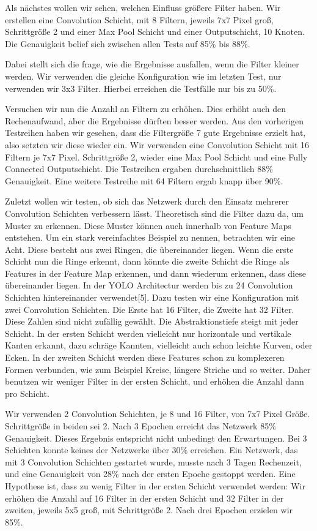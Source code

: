 \documentclass[12pt]{article}
\begin{document}
Als nächstes wollen wir sehen, welchen Einfluss größere Filter haben. Wir erstellen eine Convolution Schicht, mit 8 Filtern, jeweils 7x7 Pixel groß, Schrittgröße 2 und einer Max Pool Schicht und einer Outputschicht, 10 Knoten.
Die Genauigkeit belief sich zwischen allen Tests auf 85\% bis 88\%. 
	
Dabei stellt sich die frage, wie die Ergebnisse ausfallen, wenn die Filter kleiner werden. Wir verwenden die gleiche Konfiguration wie im letzten Test, nur verwenden wir 3x3 Filter.
Hierbei erreichen die Testfälle nur bis zu 50\%. 

Versuchen wir nun die Anzahl an Filtern zu erhöhen. Dies erhöht auch den Rechenaufwand, aber die Ergebnisse dürften besser werden. Aus den vorherigen Testreihen haben wir gesehen, dass die Filtergröße 7 gute Ergebnisse erzielt hat, also setzten wir diese wieder ein.
Wir verwenden eine Convolution Schicht mit 16 Filtern je 7x7 Pixel. Schrittgröße 2, wieder eine Max Pool Schicht und eine Fully Connected Outputschicht. Die Testreihen ergaben durchschnittlich 88\% Genauigkeit. Eine weitere Testreihe mit 64 Filtern ergab knapp über 90\%.

Zuletzt wollen wir testen, ob sich das Netzwerk durch den Einsatz mehrerer Convolution Schichten verbessern lässt. Theoretisch sind die Filter dazu da, um Muster zu erkennen. Diese Muster können auch innerhalb von Feature Maps entstehen. Um ein stark vereinfachtes Beispiel zu nennen, betrachten wir eine Acht. Diese besteht aus zwei Ringen, die übereinander liegen. Wenn die erste Schicht nun die Ringe erkennt, dann könnte die zweite Schicht die Ringe als Features in der Feature Map erkennen, und dann wiederum erkennen, dass diese übereinander liegen. In der YOLO Architectur werden bis zu 24 Convolution Schichten hintereinander verwendet[5]. Dazu testen wir eine Konfiguration mit zwei Convolution Schichten. Die Erste hat 16 Filter, die Zweite hat 32 Filter. Diese Zahlen sind nicht zufällig gewählt. Die Abstraktionstiefe steigt mit jeder Schicht. In der ersten Schicht werden vielleicht nur horizontale und vertikale Kanten erkannt, dazu schräge Kannten, vielleicht auch schon leichte Kurven, oder Ecken. In der zweiten Schicht werden diese Features schon zu komplexeren Formen verbunden, wie zum Beispiel Kreise, längere Striche und so weiter.
Daher benutzen wir weniger Filter in der ersten Schicht, und erhöhen die Anzahl dann pro Schicht.

Wir verwenden 2 Convolution Schichten, je 8 und 16 Filter, von 7x7 Pixel Größe. Schrittgröße in beiden sei 2. Nach 3 Epochen erreicht das Netzwerk 85\% Genauigkeit. Dieses Ergebnis entspricht nicht unbedingt den Erwartungen. 
Bei 3 Schichten konnte keines der Netzwerke über 30\% erreichen. Ein Netzwerk, das mit 3 Convolution Schichten gestartet wurde, musste nach 3 Tagen Rechenzeit, und eine Genauigkeit von 28\% nach der ersten Epoche gestoppt werden.
Eine Hypothese ist, dass zu wenig Filter in der ersten Schicht verwendet werden:
Wir erhöhen die Anzahl auf 16 Filter in der ersten Schicht und 32 Filter in der zweiten, jeweils 5x5 groß, mit Schrittgröße 2. Nach drei Epochen erzielen wir 85\%.
\end{document}
